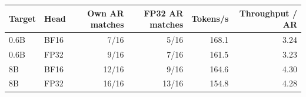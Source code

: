 \begin{tabular}{llrrrr}
\toprule
Target & Head & Own AR matches & FP32 AR matches & Tokens/s & Throughput / AR \\
\midrule
0.6B & BF16 & 7/16 & 5/16 & 168.1 & 3.24 \\
0.6B & FP32 & 9/16 & 7/16 & 161.5 & 3.23 \\
8B & BF16 & 12/16 & 9/16 & 164.6 & 4.30 \\
8B & FP32 & 16/16 & 13/16 & 154.8 & 4.28 \\
\bottomrule
\end{tabular}
